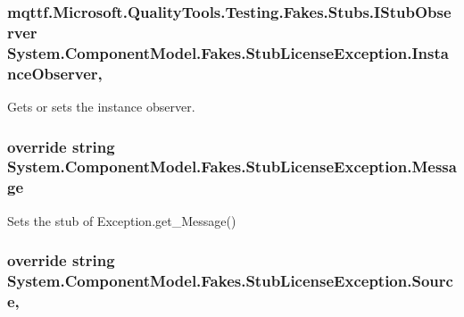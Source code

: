 \hypertarget{class_system_1_1_component_model_1_1_fakes_1_1_stub_license_exception_a4e3416c92967924560915fe70c7e435a}{
\subsubsection[{Instance\-Observer}]{\setlength{\rightskip}{0pt plus 5cm}mqttf.\-Microsoft.\-Quality\-Tools.\-Testing.\-Fakes.\-Stubs.\-I\-Stub\-Observer System.\-Component\-Model.\-Fakes.\-Stub\-License\-Exception.\-Instance\-Observer\hspace{0.3cm}{\ttfamily [get]}, {\ttfamily [set]}}}\label{class_system_1_1_component_model_1_1_fakes_1_1_stub_license_exception_a4e3416c92967924560915fe70c7e435a}


Gets or sets the instance observer.

\hypertarget{class_system_1_1_component_model_1_1_fakes_1_1_stub_license_exception_a3b039ed29462ff7e80f9e690479c1f60}{
\subsubsection[{Message}]{\setlength{\rightskip}{0pt plus 5cm}override string System.\-Component\-Model.\-Fakes.\-Stub\-License\-Exception.\-Message\hspace{0.3cm}{\ttfamily [get]}}}\label{class_system_1_1_component_model_1_1_fakes_1_1_stub_license_exception_a3b039ed29462ff7e80f9e690479c1f60}


Sets the stub of Exception.\-get\-\_\-\-Message()

\hypertarget{class_system_1_1_component_model_1_1_fakes_1_1_stub_license_exception_af72178e6ab9dde0a7fa9a663d8cf7f58}{
\subsubsection[{Source}]{\setlength{\rightskip}{0pt plus 5cm}override string System.\-Component\-Model.\-Fakes.\-Stub\-License\-Exception.\-Source\hspace{0.3cm}{\ttfamily [get]}, {\ttfamily [set]}}}\label{class_system_1_1_component_model_1_1_fakes_1_1_stub_license_exception_af72178e6ab9dde0a7fa9a663d8cf7f58}



